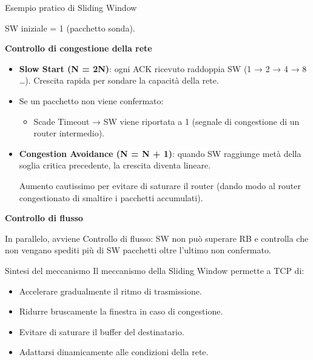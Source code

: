 \documentclass[a4paper,12pt]{report}
\begin{document}
\begin{esempiobox}{Esempio pratico di Sliding Window}

    SW iniziale = 1 (pacchetto sonda).
    \vspace{1cm}

    \textbf{Controllo di congestione della rete}
\begin{itemize}
    \item \textbf{Slow Start (N = 2N)}: ogni ACK ricevuto raddoppia SW (1 → 2 → 4 → 8 …).  
          Crescita rapida per sondare la capacità della rete.
    \item Se un pacchetto non viene confermato:
    \begin{itemize}
        \item Scade Timeout → SW viene riportata a 1 (segnale di congestione di un router intermedio).
    \end{itemize}
    \item \textbf{Congestion Avoidance (N = N + 1)}: quando SW raggiunge metà della soglia critica precedente, la crescita diventa lineare.  
    
          Aumento cautissimo per evitare di saturare il router (dando modo al router congestionato di smaltire i pacchetti accumulati).
\end{itemize}
\vspace{1cm}
\textbf{Controllo di flusso}

    In parallelo, avviene Controllo di flusso: SW non può superare RB e controlla che non vengano spediti più di SW pacchetti oltre l’ultimo non confermato.
\end{esempiobox}



\begin{notebox}{Sintesi del meccanismo}
Il meccanismo della Sliding Window permette a TCP di:
\begin{itemize}
    \item Accelerare gradualmente il ritmo di trasmissione.
    \item Ridurre bruscamente la finestra in caso di congestione.
    \item Evitare di saturare il buffer del destinatario.
    \item Adattarsi dinamicamente alle condizioni della rete.
\end{itemize}
\end{notebox}
\end{document}
